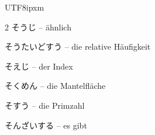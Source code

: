 \begin{CJK}{UTF8}{ipxm}
\begin{multicols}{2}
 {\footnotesize\color{black!70}そうじ} -- ähnlich\dotfill\hyperref[e:176]{\pageref*{e:176}}\par
{} {\footnotesize\color{black!70}そうたいどすう} -- die relative Häufigkeit\dotfill\hyperref[e:331]{\pageref*{e:331}}\par
{} {\footnotesize\color{black!70}そえじ} -- der Index\dotfill\hyperref[e:4]{\pageref*{e:4}}\par
{} {\footnotesize\color{black!70}そくめん} -- die Mantelfläche\dotfill\hyperref[e:250]{\pageref*{e:250}}\par
{} {\footnotesize\color{black!70}そすう} -- die Primzahl\dotfill\hyperref[e:12]{\pageref*{e:12}}\par
{} {\footnotesize\color{black!70}そんざいする} -- es gibt\dotfill\hyperref[e:353]{\pageref*{e:353}}\par


\end{multicols}
\end{CJK}
